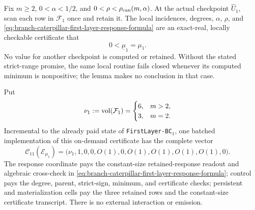 \begin{lemma}
\label{lem:branch-caterpillar-first-layer-margin-certificate}
Fix $m\geq2$, $0<\alpha<1/2$, and
$0<\rho<\rho_{\rm can}(m,\alpha)$.  At the actual checkpoint
$\widehat U_1$, scan each row in $\mathcal F_1$ once and retain it.  The local
incidences, degrees, $\alpha$, $\rho$, and
\cref{eq:branch-caterpillar-first-layer-response-formula} are an exact-real,
locally checkable certificate that
\begin{equation}
 0<\underline\mu_1=\mu_1.
 \label{eq:branch-caterpillar-first-layer-margin-equality}
\end{equation}
No value for another checkpoint is computed or retained.  Without the stated
strict-range promise, the same local routine fails closed whenever its
computed minimum is nonpositive; the lemma makes no conclusion in that case.

Put
\begin{equation}
 \nu_1:=\operatorname{vol}(\mathcal F_1)
 =\begin{cases}6,&m>2,\\3,&m=2.\end{cases}
 \label{eq:branch-caterpillar-first-layer-boundary-volume}
\end{equation}
Incremental to the already paid state of
\texttt{FirstLayer-BC}$_1$, one batched implementation of this on-demand
certificate has the complete vector
\begin{equation}
 \mathcal C_{11}(\mathcal E_{\mu_1})
 =\bigl(\nu_1,1,0,0,O(1),0,O(1),O(1),O(1),O(1),0\bigr).
 \label{eq:branch-caterpillar-first-layer-margin-certificate-vector}
\end{equation}
The response coordinate pays the constant-size retained-response readout and
algebraic cross-check in
\cref{eq:branch-caterpillar-first-layer-response-formula}; control pays the
degree, parent, strict-sign, minimum, and certificate checks; persistent and
materialization cells pay the three retained rows and the constant-size
certificate transcript.  There is no external interaction or emission.
\end{lemma}

